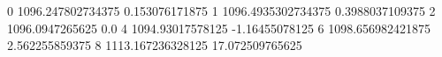 0 1096.247802734375 0.153076171875
1 1096.4935302734375 0.3988037109375
2 1096.0947265625 0.0
4 1094.93017578125 -1.16455078125
6 1098.656982421875 2.562255859375
8 1113.167236328125 17.072509765625

